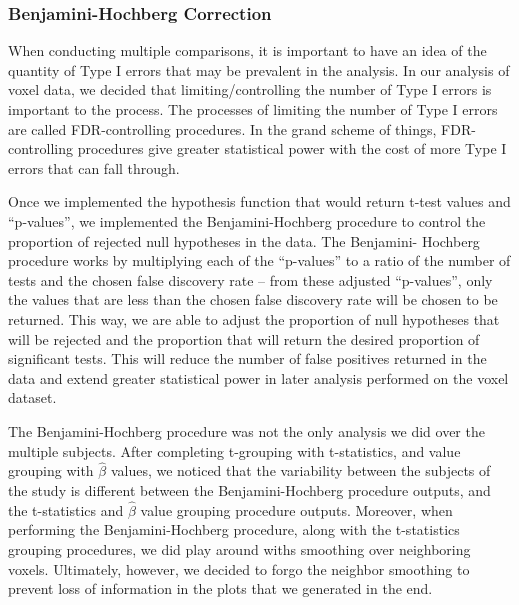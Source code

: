 
\subsubsection{Benjamini-Hochberg Correction}

\par \indent When conducting multiple comparisons, it is important to have an 
idea of the quantity of Type I errors that may be prevalent in the analysis. 
In our analysis of voxel data, we decided that limiting/controlling the number 
of Type I errors is important to the process. The processes of limiting the 
number of Type I errors are called FDR-controlling procedures. In the grand 
scheme of things, FDR-controlling procedures give greater statistical power 
with the cost of more Type I errors that can fall through. 

\par Once we implemented the hypothesis function that would return t-test 
values and ``p-values'', we implemented the Benjamini-Hochberg procedure to 
control the proportion of rejected null hypotheses in the data. The Benjamini-
Hochberg procedure works by multiplying each of the ``p-values'' to a ratio of 
the number of tests and the chosen false discovery rate -- from these adjusted 
``p-values'', only the values that are less than the chosen false discovery rate 
will be chosen to be returned. This way, we are able to adjust the proportion of 
null hypotheses that will be rejected and the proportion that will return the 
desired proportion of significant tests. This will reduce the number of false 
positives returned in the data and extend greater statistical power in later 
analysis performed on the voxel dataset.

\par The Benjamini-Hochberg procedure was not the only analysis we did over the
multiple subjects. After completing t-grouping with t-statistics, and value 
grouping with $\hat{\beta}$ values, we noticed that the variability between the
subjects of the study is different between the Benjamini-Hochberg procedure 
outputs, and the t-statistics and $\hat{\beta}$ value grouping procedure 
outputs. Moreover, when performing the Benjamini-Hochberg procedure, along with
the t-statistics grouping procedures, we did play around withs smoothing over 
neighboring voxels. Ultimately, however, we decided to forgo the neighbor 
smoothing to prevent loss of information in the plots that we generated in the 
end.

